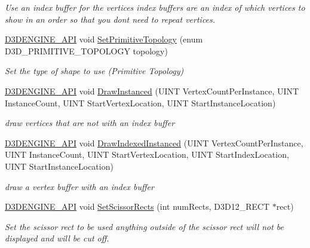 \begin{DoxyCompactItemize}
\begin{DoxyCompactList}\small\item\em Use an index buffer for the vertices index buffers are an index of which vertices to show in an order so that you don\textquotesingle{}t need to repeat vertices. \end{DoxyCompactList}\item 
\mbox{\hyperlink{stdafx_8h_a8ee2d990c5dfba7794dd2b60741d7722}{D3\+D\+E\+N\+G\+I\+N\+E\+\_\+\+A\+PI}} void \mbox{\hyperlink{class_command_list_manager_a6d15e9c6953e147362f93ce8f8a96278}{Set\+Primitive\+Topology}} (enum D3\+D\+\_\+\+P\+R\+I\+M\+I\+T\+I\+V\+E\+\_\+\+T\+O\+P\+O\+L\+O\+GY topology)
\begin{DoxyCompactList}\small\item\em Set the type of shape to use (Primitive Topology) \end{DoxyCompactList}\item 
\mbox{\hyperlink{stdafx_8h_a8ee2d990c5dfba7794dd2b60741d7722}{D3\+D\+E\+N\+G\+I\+N\+E\+\_\+\+A\+PI}} void \mbox{\hyperlink{class_command_list_manager_a6062b05f9d5c9fc7b5225e4c9b625069}{Draw\+Instanced}} (U\+I\+NT Vertex\+Count\+Per\+Instance, U\+I\+NT Instance\+Count, U\+I\+NT Start\+Vertex\+Location, U\+I\+NT Start\+Instance\+Location)
\begin{DoxyCompactList}\small\item\em draw vertices that are not with an index buffer \end{DoxyCompactList}\item 
\mbox{\hyperlink{stdafx_8h_a8ee2d990c5dfba7794dd2b60741d7722}{D3\+D\+E\+N\+G\+I\+N\+E\+\_\+\+A\+PI}} void \mbox{\hyperlink{class_command_list_manager_afc1835024199f85fd63f368c13ca724b}{Draw\+Indexed\+Instanced}} (U\+I\+NT Vertex\+Count\+Per\+Instance, U\+I\+NT Instance\+Count, U\+I\+NT Start\+Vertex\+Location, U\+I\+NT Start\+Index\+Location, U\+I\+NT Start\+Instance\+Location)
\begin{DoxyCompactList}\small\item\em draw a vertex buffer with an index buffer \end{DoxyCompactList}\item 
\mbox{\hyperlink{stdafx_8h_a8ee2d990c5dfba7794dd2b60741d7722}{D3\+D\+E\+N\+G\+I\+N\+E\+\_\+\+A\+PI}} void \mbox{\hyperlink{class_command_list_manager_ad3a754f13f381b10112abea8cb21e18a}{Set\+Scissor\+Rects}} (int num\+Rects, D3\+D12\+\_\+\+R\+E\+CT $\ast$rect)
\begin{DoxyCompactList}\small\item\em Set the scissor rect to be used anything outside of the scissor rect will not be displayed and will be cut off. \end{DoxyCompactList}\item 

\end{DoxyCompactItemize}
